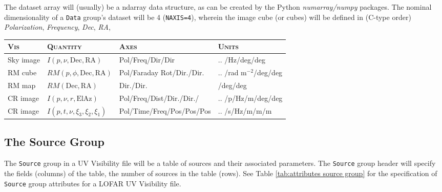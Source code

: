 \documentclass[a4paper,10pt,bibtotoc]{scrartcl}
\begin{document}
The dataset array will (usually) be a ndarray data structure, as can be created by the Python \textit{numarray/numpy} packages. The nominal dimensionality of a \texttt{Data} group's dataset will be 4 (\texttt{NAXIS=4}), wherein the image cube (or cubes) will be defined in (C-type order) \textit{Polarization}, \textit{Frequency}, \textit{Dec}, \textit{RA}, 

\begin{center}
  \begin{tabular}{|llll|}
    \hline
    \textsc{Vis} & \textsc{Quantity} & \textsc{Axes} & \textsc{Units} \\
    \hline \hline
    Sky image & $I (p, \nu,\mathrm{Dec},\mathrm{RA})$      & Pol/Freq/Dir/Dir                       & .. /Hz/deg/deg  \\
       RM cube & $RM (p, \phi,\mathrm{Dec},\mathrm{RA})$ & Pol/Faraday Rot/Dir./Dir.          & .. /rad m$^{-2}$/deg/deg \\
       RM map  & $RM (\mathrm{Dec},\mathrm{RA})$            & Dir./Dir.                                     &    /deg/deg \\
     CR image  & $I(p, \nu,r,\mathrm{El}\mathrm{Az})$        & Pol/Freq/Dist/Dir./Dir./            & .. /p/Hz/m/deg/deg \\
     CR image  & $I(p, t, \nu, \xi_3, \xi_2, \xi_1)$                 & Pol/Time/Freq/Pos/Pos/Pos     & .. /s/Hz/m/m/m \\
    \hline
  \end{tabular}
\end{center}

\subsection{The Source Group}

The \texttt{Source} group in a UV Visibility file will be a table of sources and their associated parameters.  The \texttt{Source} group header will specify the fields (columns) of the table, the number of sources in the table (rows). See Table \ref{tab:attributes source group} for the specification of \texttt{Source} group attributes for a LOFAR UV Visibility file.
\end{document}
